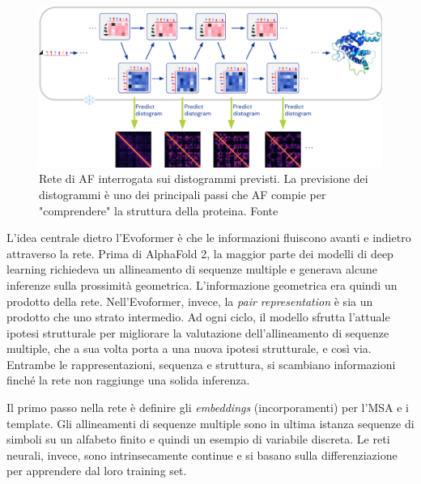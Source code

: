 \begin{figure}[!htb]
	\centering
	\includegraphics[scale=0.42]{images/evoformer2.png}
	\caption{Rete di AF interrogata sui distogrammi previsti. La previsione dei distogrammi è uno dei principali passi che AF compie per "comprendere" la struttura della proteina. Fonte\cite{AFslide}}
	\label{fig:evoformer-distogram}
\end{figure}

\par L'idea centrale dietro l'Evoformer è che le informazioni fluiscono avanti e indietro attraverso la rete. Prima di AlphaFold 2, la maggior parte dei modelli di deep learning richiedeva un allineamento di sequenze multiple e generava alcune inferenze sulla prossimità geometrica. L'informazione geometrica era quindi un prodotto della rete. Nell'Evoformer, invece, la \textit{pair representation} è sia un prodotto che uno strato intermedio. Ad ogni ciclo, il modello sfrutta l'attuale ipotesi strutturale per migliorare la valutazione dell'allineamento di sequenze multiple, che a sua volta porta a una nuova ipotesi strutturale, e così via. Entrambe le rappresentazioni, sequenza e struttura, si scambiano informazioni finché la rete non raggiunge una solida inferenza.

Il primo passo nella rete è definire gli \textit{embeddings} (incorporamenti) per l'MSA e i template. Gli allineamenti di sequenze multiple sono in ultima istanza sequenze di simboli su un alfabeto finito e quindi un esempio di variabile discreta. Le reti neurali, invece, sono intrinsecamente continue e si basano sulla differenziazione per apprendere dal loro training set. 

